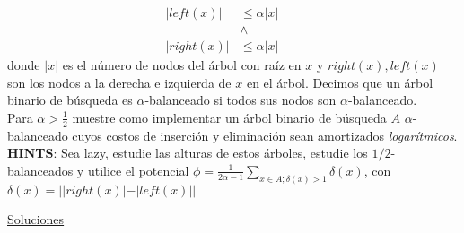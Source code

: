\documentclass[dcc,uchile]{fcfmcourse}
\theoremstyle{plain}
\theoremstyle{definition}
\begin{document}
\begin{problems}
\begin{align*}
    |left(x)| &\le \alpha |x|\quad\\
    & \land\\
    |right(x)| &\le \alpha |x|&
\end{align*}
donde $|x|$ es el número de nodos del árbol con raíz en $x$ y $right(x), left(x)$ son los nodos a la derecha e izquierda de $x$ en el árbol. Decimos que un árbol binario de búsqueda es $\alpha$-balanceado si todos sus nodos son $\alpha$-balanceado.\\
Para $\alpha>\frac{1}{2}$ muestre como implementar un árbol binario de búsqueda $A$ $\alpha$-balanceado cuyos costos de inserción y eliminación sean amortizados \textit{logarítmicos}.\\

\textbf{HINTS}: Sea lazy, estudie las alturas de estos árboles, estudie los $1/2$-balanceados y utilice el potencial $\phi = \frac{1}{2\alpha-1}\sum_{x\in A; \delta(x) > 1} \delta(x)$, con $\delta(x) = ||right(x)|-|left(x)||$
\end{problems}
\newpage
\begin{center}
{\huge \underline{Soluciones}}
\end{center}
\end{document}
